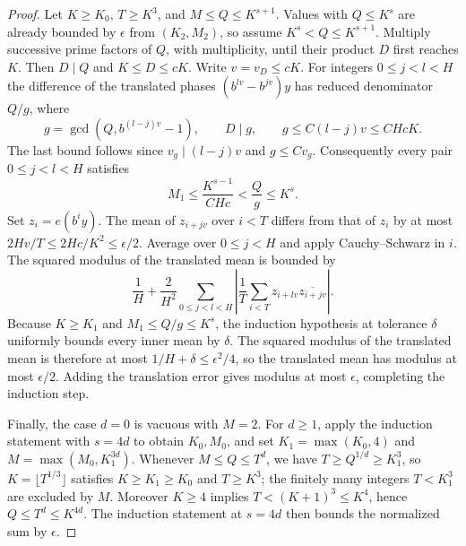 \documentclass[11pt]{article}
\begin{document}
\begin{proof}
Let \(K\ge K_0\), \(T\ge K^3\), and \(M\le Q\le K^{s+1}\). Values with \(Q\le K^s\) are already bounded by \(\epsilon\) from \((K_2,M_2)\), so assume \(K^s<Q\le K^{s+1}\). Multiply successive prime factors of \(Q\), with multiplicity, until their product \(D\) first reaches \(K\). Then \(D\mid Q\) and \(K\le D\le cK\). Write \(v=v_D\le cK\). For integers \(0\le j<l<H\) the difference of the translated phases \((b^{lv}-b^{jv})y\) has reduced denominator \(Q/g\), where
\[
 g=\gcd(Q,b^{(l-j)v}-1),\qquad D\mid g,\qquad g\le C(l-j)v\le CHcK.
\]
The last bound follows since \(v_g\mid(l-j)v\) and \(g\le C v_g\). Consequently every pair \(0\le j<l<H\) satisfies
\[
 M_1\le \frac{K^{s-1}}{CHc}<\frac{Q}{g}\le K^s.
\]
Set \(z_i=e(b^iy)\). The mean of \(z_{i+jv}\) over \(i<T\) differs from that of \(z_i\) by at most \(2Hv/T\le 2Hc/K^2\le\epsilon/2\). Average over \(0\le j<H\) and apply Cauchy--Schwarz in \(i\). The squared modulus of the translated mean is bounded by
\[
 \frac1H+\frac2{H^2}\sum_{0\le j<l<H}
       \left|\frac1T\sum_{i<T} z_{i+lv}\overline{z_{i+jv}}\right| .
\]
Because \(K\ge K_1\) and \(M_1\le Q/g\le K^s\), the induction hypothesis at tolerance \(\delta\) uniformly bounds every inner mean by \(\delta\). The squared modulus of the translated mean is therefore at most \(1/H+\delta\le\epsilon^2/4\), so the translated mean has modulus at most \(\epsilon/2\). Adding the translation error gives modulus at most \(\epsilon\), completing the induction step.

Finally, the case \(d=0\) is vacuous with \(M=2\). For \(d\ge1\), apply the induction statement with \(s=4d\) to obtain \(K_0,M_0\), and set \(K_1=\max(K_0,4)\) and \(M=\max(M_0,K_1^{3d})\). Whenever \(M\le Q\le T^d\), we have \(T\ge Q^{1/d}\ge K_1^3\), so \(K=\lfloor T^{1/3}\rfloor\) satisfies \(K\ge K_1\ge K_0\) and \(T\ge K^3\); the finitely many integers \(T<K_1^3\) are excluded by \(M\). Moreover \(K\ge4\) implies \(T<(K+1)^3\le K^4\), hence \(Q\le T^d\le K^{4d}\). The induction statement at \(s=4d\) then bounds the normalized sum by \(\epsilon\).
\end{proof}
\end{document}
